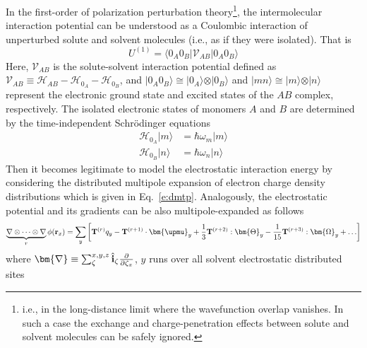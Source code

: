 \documentclass[a4paper,titlepage,twoside,fleqn,12pt]{book}
\newcommand{\BM}[1]{\bm{#1}}
\begin{document}
\begin{refsection}
In the first\hyp{}order of polarization perturbation
theory\footnote{i.e., in the long\hyp{}distance limit 
where the wavefunction overlap vanishes. In such a case the
exchange and charge\hyp{}penetration effects 
between solute and solvent molecules can be safely ignored.}, 
the intermolecular interaction potential
can be understood as a Coulombic interaction
of unperturbed solute and solvent molecules (i.e., 
as if they were isolated). \citep{Jeziorski.Moszynski.Szalewicz.ChemRev.1994,
Stone.TheTheoryOfIntermolecularForces.1996}
That is
%
\begin{equation} \label{e:eint-1}
U^{(1)} = 
\langle 0_A0_B \lvert \mathscr{V}_{AB} \rvert 0_A0_B \rangle 
\end{equation}
%
Here, $\mathscr{V}_{AB}$ is the solute\hyp{}solvent
interaction potential defined as $\mathscr{V}_{AB}\equiv\mathscr{H}_{AB} - \mathscr{H}_{0_A} - \mathscr{H}_{0_B} $,
and $\vert 0_A0_B \rangle \cong \vert 0_A \rangle \otimes \vert 0_B \rangle$
and $\vert mn \rangle \cong \vert m \rangle \otimes \vert n \rangle$
represent the electronic ground state and excited states
of the $AB$ complex, respectively. The isolated electronic states of monomers $A$
and $B$ are determined by the time\hyp{}independent Schr{\"o}dinger
equations
%
\begin{subequations}
 \begin{align}
  \mathscr{H}_{0_A} \vert m \rangle &= \hbar \omega_m \vert m \rangle \\
  \mathscr{H}_{0_B} \vert n \rangle &= \hbar \omega_n \vert n \rangle
 \end{align}
\end{subequations}
%
Then it becomes legitimate to model the electrostatic interaction
energy by considering the distributed multipole expansion of electron
charge density distributions \citep{Stone.TheTheoryOfIntermolecularForces.1996}
which is given in Eq.~\eqref{e:dmtp}. Analogously,
the electrostatic potential and its gradients
can be also multipole\hyp{}expanded as follows
%
\begin{equation} \label{e:potential-gradients}
\underbrace{\nabla \otimes \cdots \otimes \nabla}_{r} \phi({\bf r}_x) = 
\sum_y \left[ 
{\bf T}^{(r)} q_y - {\bf T}^{(r+1)} \cdot {\BM \upmu}_y + 
 \frac{1}{3} {\bf T}^{(r+2)} : {\BM \Theta}_y - 
\frac{1}{15} {\bf T}^{(r+3)} : {\BM \Omega}_y + \ldots
\right]
\end{equation}
%
where 
${\BM \nabla} \equiv \sum_{\zeta}^{x,y,z} \hat{\bf i}_\zeta \frac{\partial}{\partial \zeta_x}$, 
$y$ runs over all solvent electrostatic distributed sites

\end{refsection}
\end{document}
